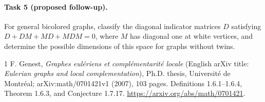 \documentclass[11pt]{article}
\begin{document}
\paragraph{Task 5 (proposed follow-up).}
For general bicolored graphs, classify the diagonal indicator matrices
\(D\) satisfying \(D+DM+MD+MDM=0\), where \(M\) has diagonal one
at white vertices, and determine the possible dimensions of this
space for graphs without twins.

\begin{thebibliography}{1}
F. Genest, \emph{Graphes eul\'eriens et compl\'ementarit\'e locale}
(English arXiv title: \emph{Eulerian graphs and local complementation}),
Ph.D. thesis, Universit\'e de Montr\'eal;
arXiv:math/0701421v1 (2007), 103 pages.
Definitions 1.6.1--1.6.4, Theorem 1.6.3,
and Conjecture 1.7.17.
\url{https://arxiv.org/abs/math/0701421}.
\end{thebibliography}
\end{document}
